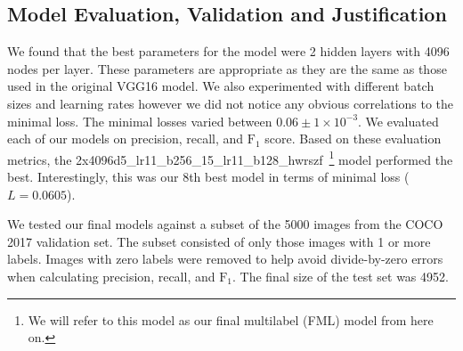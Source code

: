 \documentclass[12pt,journal,compsoc]{IEEEtran}
\begin{document}
\subsection{Model Evaluation, Validation and Justification}\label{sec:eval}


We found that the best parameters for the model were 2 hidden layers with 4096 nodes per layer.  These parameters are appropriate as they are the same as those used in the original VGG16 model.  We also experimented with different batch sizes and learning rates however we did not notice any obvious correlations to the minimal loss. The minimal losses varied between $0.06 \pm 1\times 10^{-3}$. We evaluated each of our models on precision, recall, and $\mathrm{F_1}$ score.  Based on these evaluation metrics, the 2x4096d5\_lr11\_b256\_15\_lr11\_b128\_hwrszf~\footnote{We will refer to this model as our final multilabel (FML) model from here on.} model performed the best. Interestingly, this was our 8th best model in terms of minimal loss ($L = 0.0605$). 

We tested our final models against a subset of the 5000 images from the COCO 2017 validation set. The subset consisted of only those images with 1 or more labels. Images with zero labels were removed to help avoid divide-by-zero errors when calculating precision, recall, and $\mathrm{F_1}$. The final size of the test set was 4952. 
\end{document}

